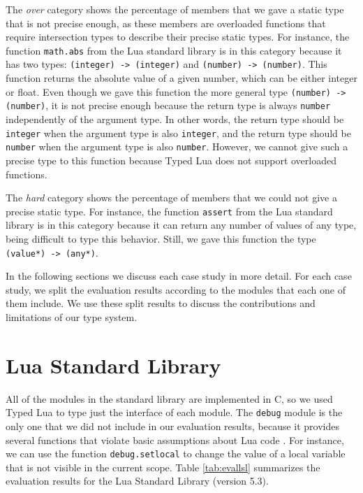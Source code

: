 The \emph{over} category shows the percentage of members that
we gave a static type that is not precise enough,
as these members are overloaded functions that require intersection
types to describe their precise static types.
For instance, the function \texttt{math.abs} from the Lua
standard library is in this category because it has two types:
\texttt{(integer) -> (integer)} and \texttt{(number) -> (number)}.
This function returns the absolute value of a given number,
which can be either integer or float.
Even though we gave this function the more general type \texttt{(number) -> (number)},
it is not precise enough because the return type is always \texttt{number}
independently of the argument type.
In other words, the return type should be \texttt{integer} when
the argument type is also \texttt{integer}, and the return type
should be \texttt{number} when the argument type is also \texttt{number}.
However, we cannot give such a precise type to this function because
Typed Lua does not support overloaded functions.

The \emph{hard} category shows the percentage of members that
we could not give a precise static type.
For instance, the function \texttt{assert} from the Lua
standard library is in this category because it can return any number
of values of any type, being difficult to type this behavior.
Still, we gave this function the type \texttt{(value*) -> (any*)}.

In the following sections we discuss each case study in more detail.
For each case study, we split the evaluation results according
to the modules that each one of them include.
We use these split results to discuss the contributions and
limitations of our type system.

\section{Lua Standard Library}

All of the modules in the standard library are implemented in C, so
we used Typed Lua to type just the interface of each module.
The \texttt{debug} module is the only one that we did not include in our
evaluation results, because it provides several functions that violate
basic assumptions about Lua code \cite{luamanual}.
For instance, we can use the function \texttt{debug.setlocal} to change the value
of a local variable that is not visible in the current scope.
Table \ref{tab:evallsl} summarizes the evaluation results for the Lua Standard Library
(version 5.3).

